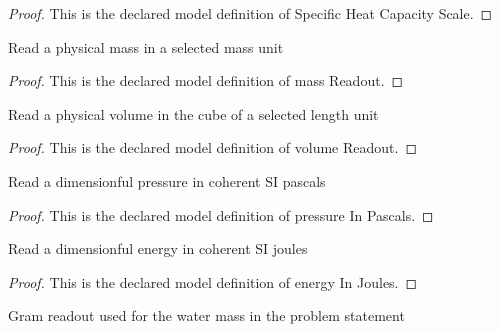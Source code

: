 \begin{proof}
  This is the declared model definition of Specific Heat Capacity Scale.
\end{proof}
\begin{definition}
  \label{def:physics:phyx-mini-0406:phyxminiproblems-problemphyxmini0406-massreadout}
  Read a physical mass in a selected mass unit
\end{definition}
\begin{proof}
  This is the declared model definition of mass Readout.
\end{proof}
\begin{definition}
  \label{def:physics:phyx-mini-0406:phyxminiproblems-problemphyxmini0406-volumereadout}
  Read a physical volume in the cube of a selected length unit
\end{definition}
\begin{proof}
  This is the declared model definition of volume Readout.
\end{proof}
\begin{definition}
  \label{def:physics:phyx-mini-0406:phyxminiproblems-problemphyxmini0406-pressureinpascals}
  Read a dimensionful pressure in coherent SI pascals
\end{definition}
\begin{proof}
  This is the declared model definition of pressure In Pascals.
\end{proof}
\begin{definition}
  \label{def:physics:phyx-mini-0406:phyxminiproblems-problemphyxmini0406-energyinjoules}
  Read a dimensionful energy in coherent SI joules
\end{definition}
\begin{proof}
  This is the declared model definition of energy In Joules.
\end{proof}
\begin{definition}
  \label{def:physics:phyx-mini-0406:phyxminiproblems-problemphyxmini0406-massingrams}
  Gram readout used for the water mass in the problem statement
\end{definition}
